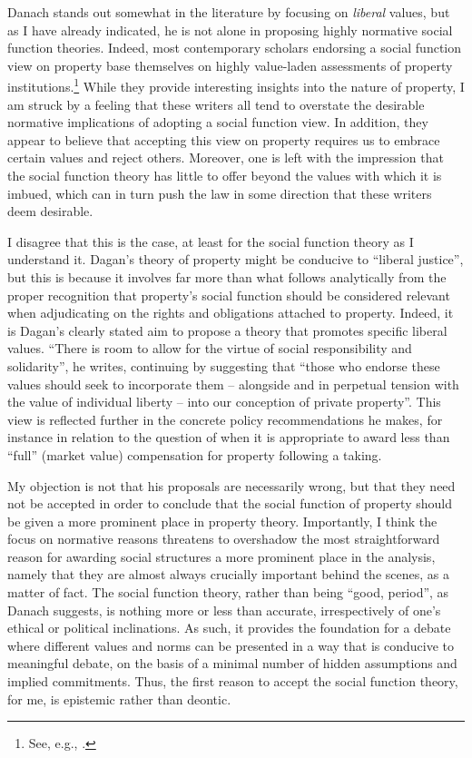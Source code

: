 Danach stands out somewhat in the literature by focusing on {\it liberal} values, but as I have already indicated, he is not alone in proposing highly normative social function theories. Indeed, most contemporary scholars endorsing a social function view on property base themselves on highly value-laden assessments of property institutions.\footnote{See, e.g.,  \cite{alexander09,crawford11,davidson11,singer09,penalver09}.} While they provide interesting insights into the nature of property, I am struck by a feeling that these writers all tend to overstate the desirable normative implications of adopting a social function view. In addition, they appear to believe that accepting this view on property requires us to embrace certain values and reject others. Moreover, one is left with the impression that the social function theory has little to offer beyond the values with which it is imbued, which can in turn push the law in some direction that these writers deem desirable. 

I disagree that this is the case, at least for the social function theory as I understand it. Dagan's theory of property might be conducive to ``liberal justice'', but this is because it involves far more than what follows analytically from the proper recognition that property's social function should be considered relevant when adjudicating on the rights and obligations attached to property. Indeed, it is Dagan's clearly stated aim to propose a theory that promotes specific liberal values. ``There is room to allow for the virtue of social responsibility and solidarity'', he writes, continuing by suggesting that ``those who endorse these values should seek to incorporate them -- alongside and in perpetual tension with the value of individual liberty -- into our conception of private property''. This view is reflected further in the concrete policy recommendations he makes, for instance in relation to the question of when it is appropriate to award less than ``full'' (market value) compensation for property following a taking.

My objection is not that his proposals are necessarily wrong, but that they need not be accepted in order to conclude that the social function of property should be given a more prominent place in property theory. Importantly, I think the focus on normative reasons threatens to overshadow the most straightforward reason for awarding social structures a more prominent place in the analysis, namely that they are almost always crucially important behind the scenes, as a matter of fact. The social function theory, rather than being ``good, period'', as Danach suggests, is nothing more or less than accurate, irrespectively of one's ethical or political inclinations. As such, it provides the foundation for a debate where different values and norms can be presented in a way that is conducive to meaningful debate, on the basis of a minimal number of hidden assumptions and implied commitments. Thus, the first reason to accept the social function theory, for me, is epistemic rather than deontic.

